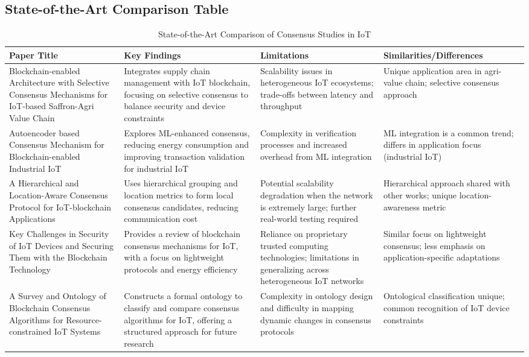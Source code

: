 \documentclass[12pt,onecolumn]{IEEEtran} %
\begin{document}
\subsection{State-of-the-Art Comparison Table}
\begin{table*}[htbp]
\caption{State-of-the-Art Comparison of Consensus Studies in IoT}
\label{tab:state_of_art}
\centering
\begin{tabularx}{\textwidth}{lXXl}
\toprule
\textbf{Paper Title} & \textbf{Key Findings} & \textbf{Limitations} & \textbf{Similarities/Differences} \\
\midrule
Blockchain-enabled Architecture with Selective Consensus Mechanisms for IoT-based Saffron-Agri Value Chain \cite{ali2022blockchainenabledarchitecture} & Integrates supply chain management with IoT blockchain, focusing on selective consensus to balance security and device constraints & Scalability issues in heterogeneous IoT ecosystems; trade-offs between latency and throughput & Unique application area in agri-value chain; selective consensus approach \\
Autoencoder based Consensus Mechanism for Blockchain-enabled Industrial IoT \cite{arifeen2022autoencoderbasedconsensus} & Explores ML-enhanced consensus, reducing energy consumption and improving transaction validation for industrial IoT & Complexity in verification processes and increased overhead from ML integration & ML integration is a common trend; differs in application focus (industrial IoT) \\
A Hierarchical and Location-Aware Consensus Protocol for IoT-blockchain Applications \cite{guo2022ahierarchicaland} & Uses hierarchical grouping and location metrics to form local consensus candidates, reducing communication cost & Potential scalability degradation when the network is extremely large; further real-world testing required & Hierarchical approach shared with other works; unique location-awareness metric \\
Key Challenges in Security of IoT Devices and Securing Them with the Blockchain Technology \cite{bryant2022keychallengesin} & Provides a review of blockchain consensus mechanisms for IoT, with a focus on lightweight protocols and energy efficiency & Reliance on proprietary trusted computing technologies; limitations in generalizing across heterogeneous IoT networks & Similar focus on lightweight consensus; less emphasis on application-specific adaptations \\
A Survey and Ontology of Blockchain Consensus Algorithms for Resource-constrained IoT Systems \cite{khan2022asurveyand} & Constructs a formal ontology to classify and compare consensus algorithms for IoT, offering a structured approach for future research & Complexity in ontology design and difficulty in mapping dynamic changes in consensus protocols & Ontological classification unique; common recognition of IoT device constraints \\
\bottomrule
\end{tabularx}
\end{table*}
\end{document}
